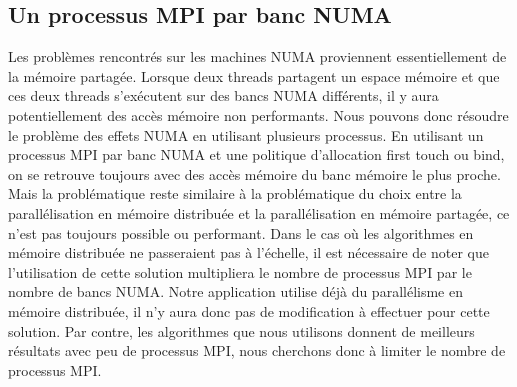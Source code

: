 \subsection{Un processus MPI par banc NUMA}
Les problèmes rencontrés sur les machines NUMA proviennent essentiellement de la mémoire partagée.
%
Lorsque deux threads partagent un espace mémoire et que ces deux threads s'exécutent sur des bancs NUMA différents, il y aura potentiellement des accès mémoire non performants.
%
Nous pouvons donc résoudre le problème des effets NUMA en utilisant plusieurs processus.
%
En utilisant un processus MPI par banc NUMA et une politique d'allocation first touch ou bind, on se retrouve toujours avec des accès mémoire du banc mémoire le plus proche.
%
Mais la problématique reste similaire à la problématique du choix entre la parallélisation en mémoire distribuée et la parallélisation en mémoire partagée, ce n'est pas toujours possible ou performant.
%
Dans le cas où les algorithmes en mémoire distribuée ne passeraient pas à l'échelle, il est nécessaire de noter que l'utilisation de cette solution multipliera le nombre de processus MPI par le nombre de bancs NUMA.
%
Notre application utilise déjà du parallélisme en mémoire distribuée, il n'y aura donc pas de modification à effectuer pour cette solution.
%
Par contre, les algorithmes que nous utilisons donnent de meilleurs résultats avec peu de processus MPI, nous cherchons donc à limiter le nombre de processus MPI.
